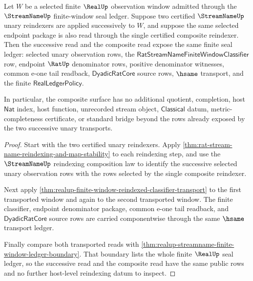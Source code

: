 \begin{theorem}
\label{thm:realup-streamname-reindexing-composition-boundary}
Let $W$ be a selected finite $\RealUp$ observation window admitted through the
$\StreamNameUp$ finite-window seal ledger. Suppose two certified
$\StreamNameUp$ unary reindexers are applied successively to $W$, and suppose
the same selected endpoint package is also read through the single certified
composite reindexer. Then the successive read and the composite read expose the
same finite seal ledger: selected unary observation rows, the
$\mathsf{RatStreamNameFiniteWindowClassifier}$ row, endpoint $\RatUp$
denominator rows, positive denominator witnesses, common e-one tail readback,
$\mathsf{DyadicRatCore}$ source rows, $\hsame$ transport, and the finite
$\mathsf{RealLedgerPolicy}$.

In particular, the composite surface has no additional quotient, completion,
host $\mathsf{Nat}$ index, host function, unrecorded stream object,
$\mathsf{Classical}$ datum, metric-completeness certificate, or standard bridge
beyond the rows already exposed by the two successive unary transports.
\end{theorem}
\begin{proof}
Start with the two certified unary reindexers. Apply
\autoref{thm:rat-stream-name-reindexing-and-map-stability} to each reindexing
step, and use the $\StreamNameUp$ reindexing composition law to identify the
successive selected unary observation rows with the rows selected by the single
composite reindexer.

Next apply
\autoref{thm:realup-finite-window-reindexed-classifier-transport} to the first
transported window and again to the second transported window. The finite
classifier, endpoint denominator package, common e-one tail readback, and
$\mathsf{DyadicRatCore}$ source rows are carried componentwise through the same
$\hsame$ transport ledger.

Finally compare both transported reads with
\autoref{thm:realup-streamname-finite-window-ledger-boundary}. That boundary
lists the whole finite $\RealUp$ seal ledger, so the successive read and the
composite read have the same public rows and no further host-level reindexing
datum to inspect.
\end{proof}

